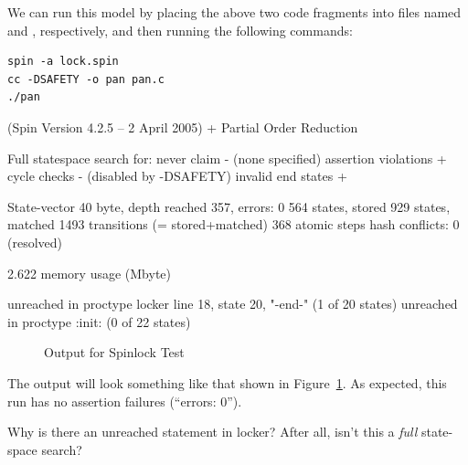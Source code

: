 We can run this model by placing the above two code fragments into
files named  and , respectively, and then running
the following commands:

\vspace{5pt}
\begin{minipage}[t]{\columnwidth}
\scriptsize
\begin{verbatim}
spin -a lock.spin
cc -DSAFETY -o pan pan.c
./pan
\end{verbatim}
\end{minipage}
\vspace{5pt}

{ \scriptsize
\begin{verbbox}
(Spin Version 4.2.5 -- 2 April 2005)
        + Partial Order Reduction

Full statespace search for:
        never claim             - (none specified)
        assertion violations    +
        cycle checks            - (disabled by -DSAFETY)
        invalid end states      +

State-vector 40 byte, depth reached 357, errors: 0
     564 states, stored
     929 states, matched
    1493 transitions (= stored+matched)
     368 atomic steps
hash conflicts: 0 (resolved)

2.622   memory usage (Mbyte)

unreached in proctype locker
        line 18, state 20, "-end-"
        (1 of 20 states)
unreached in proctype :init:
        (0 of 22 states)
\end{verbbox}
}
\begin{figure}[htbp]
\centering
\theverbbox
\caption{Output for Spinlock Test}
\label{fig:analysis:Output for Spinlock Test}
\end{figure}

The output will look something like that shown in
Figure~\ref{fig:analysis:Output for Spinlock Test}.
As expected, this run has no assertion failures (``errors: 0'').

\QuickQuiz{}
	Why is there an unreached statement in
	locker?  After all, isn't this a \emph{full} state-space
	search?
 \QuickQuizEnd

